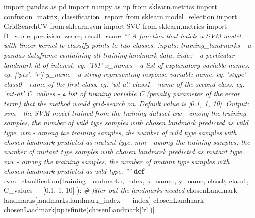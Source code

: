 \documentclass[10pt,letterpaper]{article}
\newenvironment{Shaded}{\begin{snugshade}}{\end{snugshade}}
\newcommand{\KeywordTok}[1]{\textcolor[rgb]{0.13,0.29,0.53}{\textbf{{#1}}}}
\newcommand{\DecValTok}[1]{\textcolor[rgb]{0.00,0.00,0.81}{{#1}}}
\newcommand{\FloatTok}[1]{\textcolor[rgb]{0.00,0.00,0.81}{{#1}}}
\newcommand{\StringTok}[1]{\textcolor[rgb]{0.31,0.60,0.02}{{#1}}}
\newcommand{\ImportTok}[1]{{#1}}
\newcommand{\CommentTok}[1]{\textcolor[rgb]{0.56,0.35,0.01}{\textit{{#1}}}}
\newcommand{\OperatorTok}[1]{\textcolor[rgb]{0.81,0.36,0.00}{\textbf{{#1}}}}
\newcommand{\NormalTok}[1]{{#1}}
\begin{document}
\begin{Shaded}
\begin{Highlighting}[]
\ImportTok{import} \NormalTok{pandas }\ImportTok{as} \NormalTok{pd}
\ImportTok{import} \NormalTok{numpy }\ImportTok{as} \NormalTok{np}
\ImportTok{from} \NormalTok{sklearn.metrics }\ImportTok{import} \NormalTok{confusion_matrix, classification_report}
\ImportTok{from} \NormalTok{sklearn.model_selection }\ImportTok{import} \NormalTok{GridSearchCV}
\ImportTok{from} \NormalTok{sklearn.svm }\ImportTok{import} \NormalTok{SVC}
\ImportTok{from} \NormalTok{sklearn.metrics }\ImportTok{import} \NormalTok{f1_score, precision_score, recall_score}
\CommentTok{'''}
\CommentTok{A function that builds a SVM model with linear kernel to classify points to two classes.}
\CommentTok{Inputs:}
\CommentTok{training_landmarks - a pandas dataframe containing all training landmark data.}
\CommentTok{index              - a perticular landmark id of interest. eg. '101'}
\CommentTok{x_names            - a list of explanatory variable names. eg. ['pts', 'r']}
\CommentTok{y_name             - a string representing response variable name. eg. 'stype'}
\CommentTok{class0             - name of the first class. eg. 'wt-at'}
\CommentTok{class1             - name of the second class. eg. 'mt-at'}
\CommentTok{C_values           - a list of tunning variable C (penalty parameter of the error term) that the method would grid-search on. Default value is [0.1, 1, 10].}
\CommentTok{Output:}
\CommentTok{svm                - the SVM model trained from the training dataset}
\CommentTok{ww                 - among the training samples, the number of wild type samples with chosen landmark predicted as wild type.}
\CommentTok{wm                 - among the training samples, the number of wild type samples with chosen landmark predicted as mutant type.}
\CommentTok{mm                 - among the training samples, the number of mutant type samples with chosen landmark predicted as mutant type.}
\CommentTok{mw                 - among the training samples, the number of mutant type samples with chosen landmark predicted as wild type.}
\CommentTok{'''}
\KeywordTok{def} \NormalTok{svm_classification(training_landmarks, index, x_names, y_name, class0, class1, C_values }\OperatorTok{=} \NormalTok{[}\FloatTok{0.1}\NormalTok{, }\DecValTok{1}\NormalTok{, }\DecValTok{10}\NormalTok{] ):}
    \CommentTok{# filter out the landmarks needed}
    \NormalTok{chosenLandmark }\OperatorTok{=} \NormalTok{landmarks[landmarks.landmark_index}\OperatorTok{==}\NormalTok{index]}
    \NormalTok{chosenLandmark }\OperatorTok{=} \NormalTok{chosenLandmark[np.isfinite(chosenLandmark[}\StringTok{'r'}\NormalTok{])]}
    

\end{Highlighting}
\end{Shaded}
\end{document}
